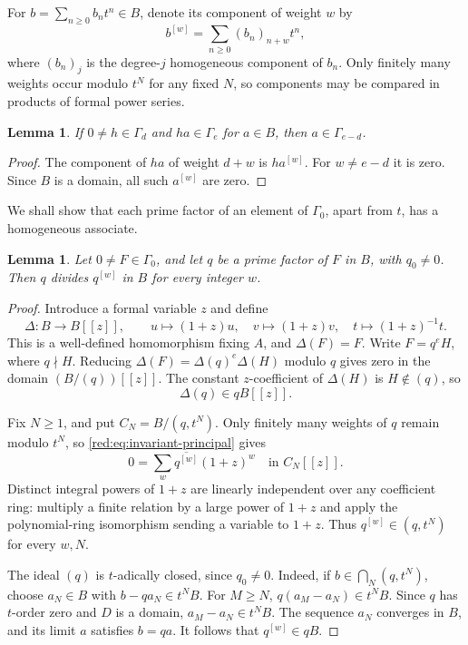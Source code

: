 \documentclass[11pt]{amsart}
\newtheorem{lemma}[theorem]{Lemma}
\theoremstyle{remark}
\begin{document}
For $b=\sum_{n\geq0}b_nt^n\in B$, denote its component of
weight $w$ by
\[
 b^{[w]}=\sum_{n\geq0}(b_n)_{n+w}t^n,
\]
where $(b_n)_j$ is the degree-$j$ homogeneous component of $b_n$.
Only finitely many weights occur modulo $t^N$ for any fixed $N$,
so components may be compared in products of formal power series.

\begin{lemma}\label{red:lem:cancellation}
If $0\ne h\in\Gamma_d$ and $ha\in\Gamma_e$ for $a\in B$,
then $a\in\Gamma_{e-d}$.
\end{lemma}

\begin{proof}
The component of $ha$ of weight $d+w$ is $ha^{[w]}$.
For $w\ne e-d$ it is zero. Since $B$ is a domain, all such
$a^{[w]}$ are zero.
\end{proof}

We shall show that each prime factor of an element of $\Gamma_0$,
apart from $t$, has a homogeneous associate.

\begin{lemma}\label{red:lem:components}
Let $0\ne F\in\Gamma_0$, and let $q$ be a prime factor of $F$
in $B$, with $q_0\ne0$. Then $q$ divides $q^{[w]}$ in $B$
for every integer $w$.
\end{lemma}

\begin{proof}
Introduce a formal variable $z$ and define
\[
 \Delta:B\longrightarrow B[[z]],\qquad
 u\longmapsto(1+z)u,\quad v\longmapsto(1+z)v,\quad
 t\longmapsto(1+z)^{-1}t.
\]
This is a well-defined homomorphism fixing $A$, and
$\Delta(F)=F$. Write $F=q^eH$, where $q\nmid H$. Reducing
$\Delta(F)=\Delta(q)^e\Delta(H)$ modulo $q$ gives zero in
the domain $(B/(q))[[z]]$. The constant $z$-coefficient of
$\Delta(H)$ is $H\notin(q)$, so
\begin{equation}\label{red:eq:invariant-principal}
 \Delta(q)\in qB[[z]].
\end{equation}

Fix $N\geq1$, and put $C_N=B/(q,t^N)$. Only finitely many
weights of $q$ remain modulo $t^N$, so
\eqref{red:eq:invariant-principal} gives
\[
 0=\sum_w\overline{q^{[w]}}(1+z)^w\quad\text{in }C_N[[z]].
\]
Distinct integral powers of $1+z$ are linearly independent over
any coefficient ring: multiply a finite relation by a large power
of $1+z$ and apply the polynomial-ring isomorphism sending a
variable to $1+z$. Thus $q^{[w]}\in(q,t^N)$ for every $w,N$.

The ideal $(q)$ is $t$-adically closed, since $q_0\ne0$.
Indeed, if $b\in\bigcap_N(q,t^N)$, choose $a_N\in B$ with
$b-qa_N\in t^NB$. For $M\geq N$,
$q(a_M-a_N)\in t^NB$. Since $q$ has $t$-order zero and
$D$ is a domain, $a_M-a_N\in t^NB$. The sequence $a_N$
converges in $B$, and its limit $a$ satisfies $b=qa$.
It follows that $q^{[w]}\in qB$.
\end{proof}
\end{document}
